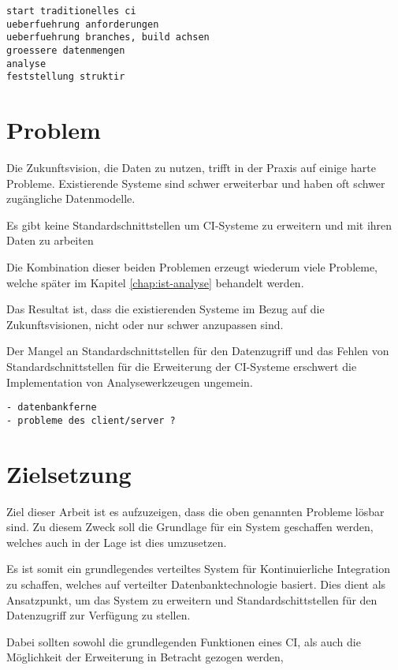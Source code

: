 

\begin{verbatim}
start traditionelles ci
ueberfuehrung anforderungen
ueberfuehrung branches, build achsen
groessere datenmengen
analyse
feststellung struktir
\end{verbatim}



\section{Problem}

Die Zukunftsvision, die Daten zu nutzen,
trifft in der Praxis auf einige harte Probleme.
Existierende Systeme sind schwer erweiterbar und haben oft schwer zugängliche Datenmodelle.

Es gibt keine Standardschnittstellen um CI-Systeme zu erweitern und mit ihren Daten zu arbeiten

Die Kombination dieser beiden Problemen erzeugt wiederum viele Probleme,
welche später im Kapitel \ref{chap:ist-analyse} behandelt werden.

Das Resultat ist, dass die existierenden Systeme im Bezug auf die Zukunftsvisionen,
nicht oder nur schwer anzupassen sind.

Der Mangel an Standardschnittstellen für den Datenzugriff und
das Fehlen von Standardschnittstellen für die Erweiterung der CI-Systeme
erschwert die Implementation von Analysewerkzeugen ungemein.



\begin{verbatim}
- datenbankferne
- probleme des client/server ?
\end{verbatim}

\section{Zielsetzung}

Ziel dieser Arbeit ist es  aufzuzeigen, dass die oben genannten Probleme lösbar sind.
Zu diesem Zweck soll die Grundlage für ein System geschaffen werden,
welches auch in der Lage ist dies umzusetzen.

Es ist somit ein grundlegendes verteiltes System f\"ur Kontinuierliche Integration zu schaffen,
welches auf verteilter Datenbanktechnologie basiert.
Dies dient als Ansatzpunkt, um das System zu erweitern und
Standardschittstellen f\"ur den Datenzugriff zur Verf\"ugung zu stellen.

Dabei sollten sowohl die grundlegenden Funktionen eines CI,
als auch die M\"oglichkeit der Erweiterung in Betracht gezogen werden,

